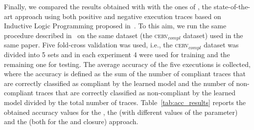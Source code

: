 Finally, we compared the results obtained with \nd with the ones of \decminer, the state-of-the-art approach using both positive and negative execution traces based on Inductive Logic Programming proposed in~\cite{2007b-Lamma}. To this aim, we run the same procedure described in~\cite{2007b-Lamma} on the same dataset (the \textsc{cerv$_{compl}$} dataset) used in the same paper. Five fold-cross validation was used, i.e., the \textsc{cerv$_{compl}$} dataset was divided into 5 sets and in each experiment 4 were used for training and the remaining one for testing. The average accuracy of the five executions is collected, where the accuracy is defined as the sum of the number of compliant traces that are correctly classified as compliant by the learned model and the number of non-compliant traces that are correctly classified as non-compliant by the learned model divided by the total number of traces. Table~\ref{tab:acc_results} reports the obtained accuracy values for the \decminer, the \declareminer (with different values of the  parameter) and the \nd (both for the \minclos and \subsetclos closure) approach.

\begin{table} [h]
	\centering
		\caption{Accuracy results obtained with \declareminer, \decminer and \nd}
		\label{tab:acc_results}
\end{table}



